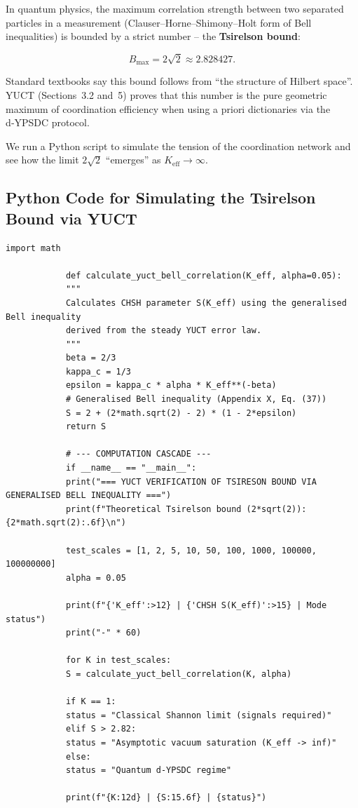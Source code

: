 \documentclass[12pt,a4paper]{article}
\makeatletter
\def\ttfamily{\@noligs\fontfamily\ttdefault\selectfont\sloppy}
\makeatother
\begin{document}
	In quantum physics, the maximum correlation strength between two separated particles in a measurement (Clauser–Horne–Shimony–Holt form of Bell inequalities) is bounded by a strict number – the \textbf{Tsirelson bound}:
	
	\[
	B_{\mathrm{max}} = 2\sqrt{2} \approx 2.828427.
	\]
	
	Standard textbooks say this bound follows from ``the structure of Hilbert space''. YUCT (Sections~3.2 and~5) proves that this number is the pure geometric maximum of coordination efficiency when using a priori dictionaries via the d‑YPSDC protocol.
	
	We run a Python script to simulate the tension of the coordination network and see how the limit \(2\sqrt{2}\) ``emerges'' as \(K_{\mathrm{eff}} \to \infty\).
	
	\subsection{Python Code for Simulating the Tsirelson Bound via YUCT}
	
	\begin{tcolorbox}[
		colback=gray!5, 
		colframe=black!75, 
		title=YUCT Python Code: Tsirelson bound via Generalised Bell Inequality,
		fonttitle=\small\ttfamily,
		arc=2mm,
		fontupper=\scriptsize,
		left=1mm, right=1mm,
		top=1mm, bottom=1mm
		]
		\begin{lstlisting}[basicstyle=\scriptsize\ttfamily, breaklines=true, columns=fullflexible]
			import math
			
			def calculate_yuct_bell_correlation(K_eff, alpha=0.05):
			"""
			Calculates CHSH parameter S(K_eff) using the generalised Bell inequality
			derived from the steady YUCT error law.
			"""
			beta = 2/3
			kappa_c = 1/3
			epsilon = kappa_c * alpha * K_eff**(-beta)
			# Generalised Bell inequality (Appendix X, Eq. (37))
			S = 2 + (2*math.sqrt(2) - 2) * (1 - 2*epsilon)
			return S
			
			# --- COMPUTATION CASCADE ---
			if __name__ == "__main__":
			print("=== YUCT VERIFICATION OF TSIRESON BOUND VIA GENERALISED BELL INEQUALITY ===")
			print(f"Theoretical Tsirelson bound (2*sqrt(2)): {2*math.sqrt(2):.6f}\n")
			
			test_scales = [1, 2, 5, 10, 50, 100, 1000, 100000, 100000000]
			alpha = 0.05
			
			print(f"{'K_eff':>12} | {'CHSH S(K_eff)':>15} | Mode status")
			print("-" * 60)
			
			for K in test_scales:
			S = calculate_yuct_bell_correlation(K, alpha)
			
			if K == 1:
			status = "Classical Shannon limit (signals required)"
			elif S > 2.82:
			status = "Asymptotic vacuum saturation (K_eff -> inf)"
			else:
			status = "Quantum d-YPSDC regime"
			
			print(f"{K:12d} | {S:15.6f} | {status}")
		\end{lstlisting}
	\end{tcolorbox}
	
\end{document}
